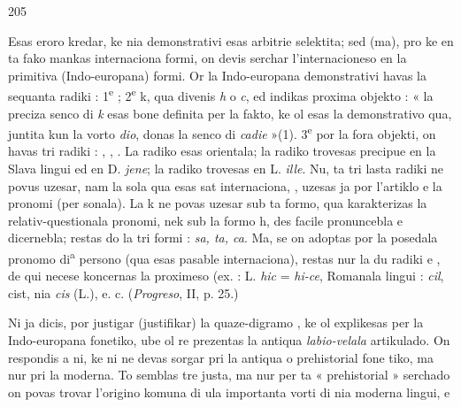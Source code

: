 \begin{VUpage}[209]{205}
\VUsaut{1.29mm}
\VUsaut{4.43mm}

Esas eroro kredar, ke nia demonstrativi esas arbitrie\nl
selektita; sed (ma), pro ke en ta fako mankas internaciona\nl
formi, on devis serchar l'internacioneso en la primitiva\nl
(Indo-europana) formi. Or la Indo-europana demonstrativi\nl
havas la sequanta radiki : 1\textsuperscript{e} ; 2\textsuperscript{e} k, qua divenis \textit{h} o \textit{c},\nl
ed indikas proxima objekto : « la preciza senco di \textit{k} esas\nl
bone definita per la fakto, ke ol esas la demonstrativo qua,\nl
juntita kun la vorto \textit{dio}, donas la senco di \textit{cadie} »(1). 3\textsuperscript{e} por\nl
la fora objekti, on havas tri radiki : , , . La radiko \nl
esas orientala; la radiko  trovesas precipue en la Slava\nl
lingui ed en D. \textit{jene}; la radiko  trovesas en L. \textit{ille}. Nu, ta\nl
tri lasta radiki ne povus uzesar, nam la sola qua esas sat\nl
internaciona, , uzesas ja por l'artiklo e la pronomi (per\cc
sonala). La k ne povas uzesar sub ta formo, qua karakterizas\nl
la relativ-questionala pronomi, nek sub la formo h, des\cc
facile pronuncebla e dicernebla; restas do la tri formi :\nl
\textit{sa, ta, ca}. Ma, se on adoptas  por la posedala pronomo di\textsuperscript{a} persono (qua esas pasable internaciona), restas nur la\nl
du radiki  e , de qui  necese koncernas la proximeso\nl
(ex. : L. \textit{hic} = \textit{hi-ce}, Romanala lingui : \textit{cil}, cist, nia \textit{cis}\nl
(L.), e. c. (\textit{Progreso}, II, p. 25.)

\VUblanc{6.28mm}
\VUblanc{2.01mm}

Ni ja dicis, por justigar (justifikar) la quaze-digramo ,\nl
ke ol explikesas per la Indo-europana fonetiko, ube ol re\cc
prezentas la antiqua \textit{labio-velala} artikulado. On respondis a\nl
ni, ke ni ne devas sorgar pri la antiqua o prehistorial fone\cc
tiko, ma nur pri la moderna. To semblas tre justa, ma nur\nl
per ta « prehistorial » serchado on povas trovar l'origino\nl
komuna di ula importanta vorti di nia moderna lingui, e\nl
\end{VUpage}

